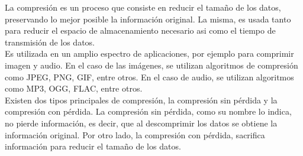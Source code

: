La compresión es un proceso que consiste en reducir el tamaño de los datos, preservando lo mejor posible la información original. La misma, es usada tanto para reducir el espacio de almacenamiento necesario asi como el tiempo de transmisión de los datos. \\

Es utilizada en un amplio espectro de aplicaciones, por ejemplo para comprimir imagen y audio. En el caso de las imágenes, se utilizan algoritmos de compresión como JPEG, PNG, GIF, entre otros. En el caso de audio, se utilizan algoritmos como MP3, OGG, FLAC, entre otros. \\

Existen dos tipos principales de compresión, la compresión sin pérdida y la compresión con pérdida. La compresión sin pérdida, como su nombre lo indica, no pierde información, es decir, que al descomprimir los datos se obtiene la información original. Por otro lado, la compresión con pérdida, sacrifica información para reducir el tamaño de los datos. \\
